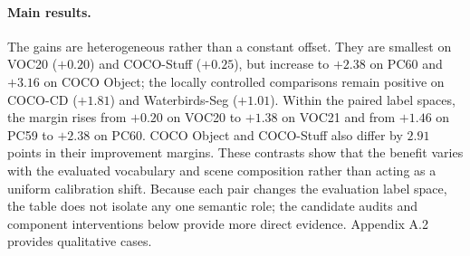 \documentclass[letterpaper]{article}
\begin{document}
	\paragraph{Main results.}
	The gains are heterogeneous rather than a constant offset. They are smallest on VOC20 ($+0.20$) and COCO-Stuff ($+0.25$), but increase to $+2.38$ on PC60 and $+3.16$ on COCO Object; the locally controlled comparisons remain positive on COCO-CD ($+1.81$) and Waterbirds-Seg ($+1.01$). Within the paired label spaces, the margin rises from $+0.20$ on VOC20 to $+1.38$ on VOC21 and from $+1.46$ on PC59 to $+2.38$ on PC60. COCO Object and COCO-Stuff also differ by $2.91$ points in their improvement margins. These contrasts show that the benefit varies with the evaluated vocabulary and scene composition rather than acting as a uniform calibration shift. Because each pair changes the evaluation label space, the table does not isolate any one semantic role; the candidate audits and component interventions below provide more direct evidence. Appendix A.2 provides qualitative cases.
	
\end{document}
